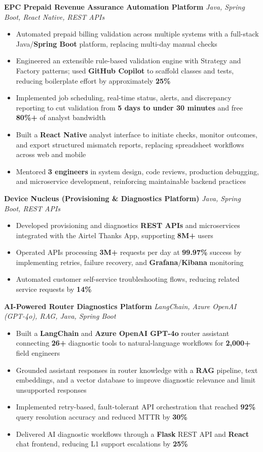 \documentclass[letterpaper,11pt]{article}
\newcommand{\resumeItem}[1]{
  \item\small{{#1 \vspace{-2pt}}}
}
\newcommand{\resumeItemListStart}{\begin{itemize}}
\newcommand{\resumeItemListEnd}{\end{itemize}\vspace{-5pt}}
\begin{document}
      \vspace{4pt}
      \textbf{\small EPC Prepaid Revenue Assurance Automation Platform} \hfill \textit{\small Java, Spring Boot, React Native, REST APIs} \\
      \vspace{-2pt}
      \resumeItemListStart
        \resumeItem{Automated prepaid billing validation across multiple systems with a full-stack Java/\textbf{Spring Boot} platform, replacing multi-day manual checks}
        \resumeItem{Engineered an extensible rule-based validation engine with Strategy and Factory patterns; used \textbf{GitHub Copilot} to scaffold classes and tests, reducing boilerplate effort by approximately \textbf{25\%}}
        \resumeItem{Implemented job scheduling, real-time status, alerts, and discrepancy reporting to cut validation from \textbf{5 days to under 30 minutes} and free \textbf{80\%+} of analyst bandwidth}
        \resumeItem{Built a \textbf{React Native} analyst interface to initiate checks, monitor outcomes, and export structured mismatch reports, replacing spreadsheet workflows across web and mobile}
        \resumeItem{Mentored \textbf{3 engineers} in system design, code reviews, production debugging, and microservice development, reinforcing maintainable backend practices}
      \resumeItemListEnd

      \vspace{4pt}
      \textbf{\small Device Nucleus (Provisioning \& Diagnostics Platform)} \hfill \textit{\small Java, Spring Boot, REST APIs} \\
      \vspace{-2pt}
      \resumeItemListStart
        \resumeItem{Developed provisioning and diagnostics \textbf{REST APIs} and microservices integrated with the Airtel Thanks App, supporting \textbf{8M+} users}
        \resumeItem{Operated APIs processing \textbf{3M+} requests per day at \textbf{99.97\%} success by implementing retries, failure recovery, and \textbf{Grafana}/\textbf{Kibana} monitoring}
        \resumeItem{Automated customer self-service troubleshooting flows, reducing related service requests by \textbf{14\%}}
      \resumeItemListEnd

      \vspace{4pt}
      \textbf{\small AI-Powered Router Diagnostics Platform} \hfill \textit{\small LangChain, Azure OpenAI (GPT-4o), RAG, Java, Spring Boot} \\
      \vspace{-2pt}
      \resumeItemListStart
        \resumeItem{Built a \textbf{LangChain} and \textbf{Azure OpenAI GPT-4o} router assistant connecting \textbf{26+} diagnostic tools to natural-language workflows for \textbf{2,000+} field engineers}
        \resumeItem{Grounded assistant responses in router knowledge with a \textbf{RAG} pipeline, text embeddings, and a vector database to improve diagnostic relevance and limit unsupported responses}
        \resumeItem{Implemented retry-based, fault-tolerant API orchestration that reached \textbf{92\%} query resolution accuracy and reduced MTTR by \textbf{30\%}}
        \resumeItem{Delivered AI diagnostic workflows through a \textbf{Flask} REST API and \textbf{React} chat frontend, reducing L1 support escalations by \textbf{25\%}}
      \resumeItemListEnd
\end{document}
